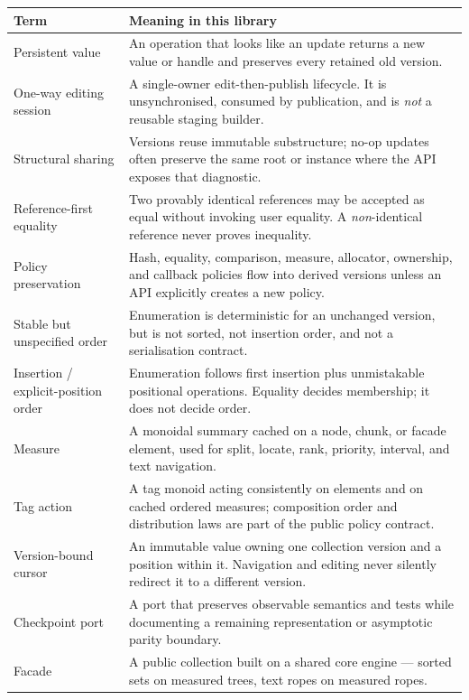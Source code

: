 \documentclass[11pt,twoside,openright]{book}
\makeatletter
\newenvironment{d7table}[1]
  {\par\vspace{3pt}\small
   \setlength{\LTpre}{4pt}\setlength{\LTpost}{4pt}
   \begin{longtable}{@{}%
     >{\raggedright\arraybackslash}p{#1\textwidth}%
     @{\hspace{10pt}}%
     >{\raggedright\arraybackslash}p{\dimexpr\textwidth-#1\textwidth-10pt\relax}@{}}}
  {\end{longtable}}
\newcommand{\thead}[1]{\sffamily\bfseries\footnotesize\color{d7ink}#1}
\makeatother
\begin{document}
\begin{d7table}{0.27}
\toprule
\thead{Term} & \thead{Meaning in this library} \\
\midrule
Persistent value & An operation that looks like an update returns a new value or
handle and preserves every retained old version. \\
One-way editing session & A single-owner edit-then-publish lifecycle. It is
unsynchronised, consumed by publication, and is \emph{not} a reusable staging
builder. \\
Structural sharing & Versions reuse immutable substructure; no-op updates often
preserve the same root or instance where the API exposes that diagnostic. \\
Reference-first equality & Two provably identical references may be accepted as
equal without invoking user equality. A \emph{non}-identical reference never
proves inequality. \\
Policy preservation & Hash, equality, comparison, measure, allocator, ownership,
and callback policies flow into derived versions unless an API explicitly
creates a new policy. \\
Stable but unspecified order & Enumeration is deterministic for an unchanged
version, but is not sorted, not insertion order, and not a serialisation
contract. \\
Insertion / explicit-position order & Enumeration follows first insertion plus
unmistakable positional operations. Equality decides membership; it does not
decide order. \\
Measure & A monoidal summary cached on a node, chunk, or facade element, used
for split, locate, rank, priority, interval, and text navigation. \\
Tag action & A tag monoid acting consistently on elements and on cached ordered
measures; composition order and distribution laws are part of the public policy
contract. \\
Version-bound cursor & An immutable value owning one collection version and a
position within it. Navigation and editing never silently redirect it to a
different version. \\
Checkpoint port & A port that preserves observable semantics and tests while
documenting a remaining representation or asymptotic parity boundary. \\
Facade & A public collection built on a shared core engine --- sorted sets on
measured trees, text ropes on measured ropes. \\
\bottomrule
\end{d7table}
\end{document}
